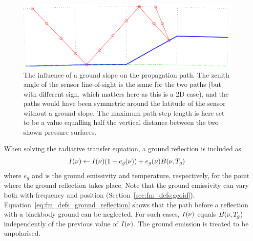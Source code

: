 \begin{figure}[!t]
 \begin{center}
  \includegraphics*[width=0.95\hsize]{Figs/fm_definitions/ppath_cases2}
  \caption{The influence of a ground slope on the propagation path. The zenith
    angle of the sensor line-of-sight is the same for the two paths (but with
    different sign, which matters here as this is a 2D case), and the paths
    would have been symmetric around the latitude of the sensor without a 
    ground slope. The maximum path step length is here set to be a value
    equalling half the vertical distance between the two shown pressure
    surfaces.}
  \label{fig:fm_defs:ppath_cases2}
 \end{center}
\end{figure}

When solving the radiative transfer equation, a ground reflection is
included as
\begin{equation}
  I(\nu) \gets I(\nu)(1-e_g(\nu)) + e_g(\nu)B(\nu,T_{g})
  \label{eq:fm_defs_ground_reflection}
\end{equation}
where $e_g$ and  is the ground emissivity and temperature,
respectively, for the point where the ground reflection takes place.
Note that the ground emissivity can vary both with frequency and
position (Section~\ref{sec:fm_defs:geoid}).
Equation~\ref{eq:fm_defs_ground_reflection} shows that the path before
a reflection with a blackbody ground can be neglected. For such cases,
$I(\nu)$ equals $B(\nu,T_{g})$ independently of the previous
value of $I(\nu)$. The ground emission is treated to be
unpolarised.

